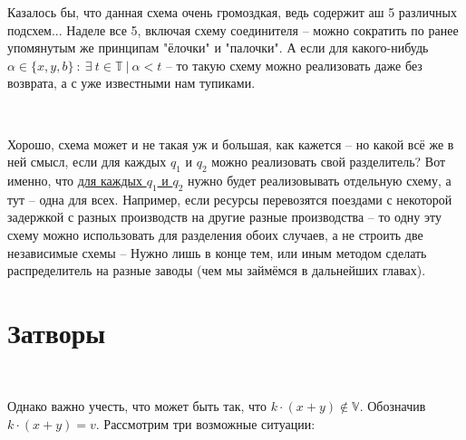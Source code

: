 







\vspace{0.5in}

Казалось бы, что данная схема очень громоздкая, ведь содержит аш 5 различных подсхем... Наделе все 5, включая схему соединителя -- можно сократить по ранее упомянутым же принципам "ёлочки" и "палочки". А если для какого-нибудь $\alpha \in \{ x, y, b \} \ : \ \exists \ t \in \mathbb{T} \ | \ \alpha < t$ -- то такую схему можно реализовать даже без возврата, а с уже известными нам тупиками.

\

Хорошо, схема может и не такая уж и большая, как кажется -- но какой всё же в ней смысл, если для каждых $q_1$ и $q_2$ можно реализовать свой разделитель? Вот именно, что \underline{для каждых $q_1$ и $q_2$} нужно будет реализовывать отдельную схему, а тут -- одна для всех. Например, если ресурсы перевозятся поездами с некоторой задержкой с разных производств на другие разные производства -- то одну эту схему можно использовать для разделения обоих случаев, а не строить две независимые схемы -- Нужно лишь в конце тем, или иным методом сделать распределитель на разные заводы (чем мы займёмся в дальнейших главах).










\vspace{0.5in}

\section{Затворы}

\

Однако важно учесть, что может быть так, что $k\cdot(x+y) \not\in \mathbb{V}$. Обозначив $k\cdot(x+y) = v$. Рассмотрим три возможные ситуации:

